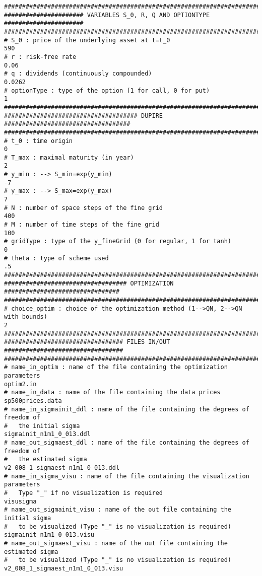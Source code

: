 \documentclass[12pt]{article}
\begin{document}
\begin{verbatim}
################################################################################
###################### VARIABLES S_0, R, Q AND OPTIONTYPE ######################
################################################################################
# S_0 : price of the underlying asset at t=t_0
590
# r : risk-free rate     
0.06
# q : dividends (continuously compounded) 
0.0262
# optionType : type of the option (1 for call, 0 for put)  
1
################################################################################
##################################### DUPIRE ###################################
################################################################################
# t_0 : time origin
0
# T_max : maximal maturity (in year)
2
# y_min : --> S_min=exp(y_min)     
-7
# y_max : --> S_max=exp(y_max)
7
# N : number of space steps of the fine grid
400
# M : number of time steps of the fine grid
100
# gridType : type of the y_fineGrid (0 for regular, 1 for tanh)
0
# theta : type of scheme used
.5
################################################################################
################################## OPTIMIZATION ################################
################################################################################
# choice_optim : choice of the optimization method (1-->QN, 2-->QN with bounds)
2
################################################################################
################################# FILES IN/OUT #################################
################################################################################
# name_in_optim : name of the file containing the optimization parameters
optim2.in
# name_in_data : name of the file containing the data prices
sp500prices.data
# name_in_sigmainit_ddl : name of the file containing the degrees of freedom of
#   the initial sigma
sigmainit_n1m1_0_013.ddl
# name_out_sigmaest_ddl : name of the file containing the degrees of freedom of
#   the estimated sigma
v2_008_1_sigmaest_n1m1_0_013.ddl
# name_in_sigma_visu : name of the file containing the visualization parameters
#   Type "_" if no visualization is required
visusigma
# name_out_sigmainit_visu : name of the out file containing the initial sigma 
#   to be visualized (Type "_" is no visualization is required)
sigmainit_n1m1_0_013.visu
# name_out_sigmaest_visu : name of the out file containing the estimated sigma
#   to be visualized (Type "_" is no visualization is required)
v2_008_1_sigmaest_n1m1_0_013.visu
\end{verbatim}
\end{document}
